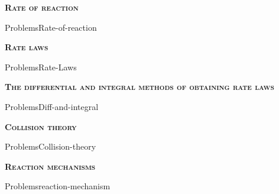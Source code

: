 \documentclass[main.tex]{subfiles}
\newcommand\chapterlabel{Ch-kinetics}
\begin{document}
\newpage
 
\fancyhfoffset[E,O]{0pt}
\setlength{\columnsep}{30pt}
\begin{conclusion}
\end{conclusion}
\begin{multicols*}{2}\setcounter{numA}{1}



{\raggedright\textsc{\textbf{Rate of reaction }}\par} {ProblemsRate-of-reaction}
{\raggedright\textsc{\textbf{Rate laws }}\par} {ProblemsRate-Laws}
{\raggedright\textsc{\textbf{The differential and integral methods of obtaining rate laws }}\par}{ProblemsDiff-and-integral}
{\raggedright\textsc{\textbf{Collision theory }}\par}{ProblemsCollision-theory}
{\raggedright\textsc{\textbf{Reaction mechanisms }}\par}{Problemsreaction-mechanism}

\end{multicols*} \iftoggle{showfinalanswers}{
\newpage\fancyhfoffset[E,O]{0pt}
\begin{answerbox}
\begin{answersenvironment}
 \begin{localsize}{10}
{ \checkoddpage\ifoddpage    \else   \clearpage\thispagestyle{empty}\mbox{}\clearpage\fi
\Large \bf Answers}
\SetupExSheets{ headings = inline-nr , counter-format = qu) ,}
\printsolutions 
  \vspace{20cm}
 \end{localsize}
 \end{answersenvironment}
\end{answerbox}
}{}
\checkoddpage\ifoddpage   \clearpage\thispagestyle{empty}\mbox{}\clearpage \else   \fi
\end{document}
